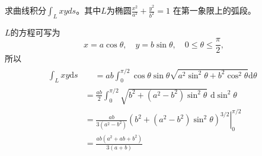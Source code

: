 \documentclass[lang=cn,10pt]{elegantbook}
\begin{document}
\begin{example}
    求曲线积分$\int_Lxyds$。其中$L$为椭圆$\frac{x^2}{a^2}+\frac{y^2}{b^2}=1$
    在第一象限上的弧段。
\end{example}
\begin{solution}
    $L$的方程可写为
    \begin{equation*}
        x=a\cos\theta,\quad y=b\sin\theta,\quad0\leqslant\theta\leqslant\frac\pi2,
    \end{equation*}
    所以
    \begin{equation*}
        \begin{aligned}
            \int_{L}xy\mathrm{d}s &
            \begin{aligned}
                 & =ab\int_0^{\pi/2}\cos\theta\sin\theta\sqrt{a^2\sin^2\theta+b^2\cos^2\theta}\mathrm{d}\theta
            \end{aligned}                    \\
                                  & =\frac{ab}2\int_0^{\pi/2}\sqrt{b^2+(a^2-b^2)\sin^2\theta}\text{ d}\sin^2\theta            \\
                                  & =\frac{ab}{3(a^2-b^2)}\left.\left(b^2+(a^2-b^2)\sin^2\theta\right)^{3/2}\right|_0^{\pi/2} \\
                                  & =\frac{ab(a^2+ab+b^2)}{3(a+b)}
        \end{aligned}
    \end{equation*}
\end{solution}
\end{document}
